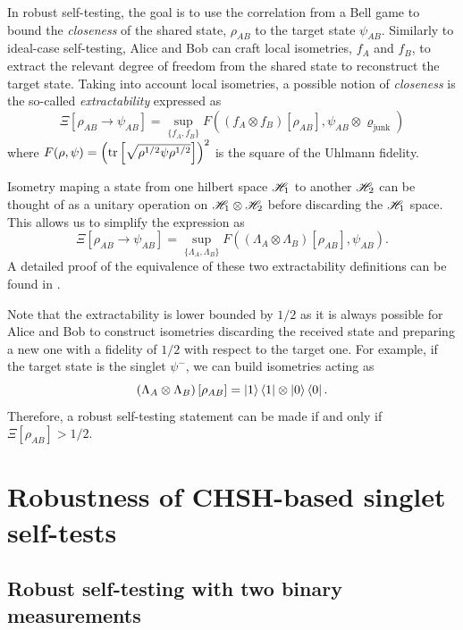 In robust self-testing, the goal is to use the correlation from a Bell game to bound the \textit{closeness} of the shared state, $\rho_{AB}$ to the target state $\psi_{AB}$.
Similarly to ideal-case self-testing, Alice and Bob can craft local isometries, $f_A$ and $f_B$, to extract the relevant degree of freedom from the shared state to reconstruct the target state.
Taking into account local isometries, a possible notion of \textit{closeness} is the so-called \textit{extractability} expressed as
\begin{equation}
	\Xi [\rho_{AB} \rightarrow \psi_{AB}] = \sup_{\{f_A,f_B\}} F((f_A \otimes f_B)[\rho_{AB}],\psi_{AB} \otimes \varrho_\text{junk})
	\label{eq:extractability_junk}
\end{equation}
where $F(\rho,\psi) = \left(\trr{\sqrt{\rho^{1/2}\psi\rho^{1/2}}}\right)^2$ is the square of the Uhlmann fidelity.

Isometry maping a state from one hilbert space $\mathscr{H}_1$ to another $\mathscr{H}_2$ can be thought of as a unitary operation on $\mathscr{H}_1 \otimes \mathscr{H}_2$ before discarding the $\mathscr{H}_1$ space.
This allows us to simplify the expression  as
\begin{equation}
	\Xi [\rho_{AB} \rightarrow \psi_{AB}] = \sup_{\{\Lambda_A,\Lambda_B\}} F((\Lambda_A \otimes \Lambda_B)[\rho_{AB}],\psi_{AB}).
	\label{eq:extractability}
\end{equation}
A detailed proof of the equivalence of these two extractability definitions can be found in \cite{Sekatski2018}.


Note that the extractability is lower bounded by $1/2$ as it is always possible for Alice and Bob to construct isometries discarding the received state and preparing a new one with a fidelity of $1/2$ with respect to the target one. 
For example, if the target state is the singlet $\psi^{-}$, we can build isometries acting as
\begin{equation}	
	\left(\Lambda_A \otimes \Lambda_B\right)[\rho_{AB}] = \ket{1}\bra{1} \otimes \ket{0}\bra{0}.
\end{equation}
Therefore, a robust self-testing statement can be made if and only if $\Xi[\rho_{AB}]>1/2$.


\section{Robustness of CHSH-based singlet self-tests}

\subsection{Robust self-testing with two binary measurements}

